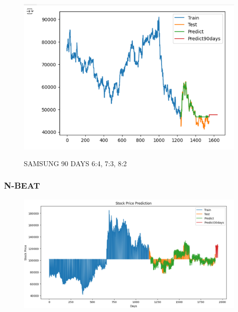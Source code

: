 \documentclass{article}
\begin{document}
\begin{multicols}{2}
\begin{figure}[H]
\begin{minipage}{0.15\textwidth}
    \label{fig:2}
    \end{minipage}%
    \begin{minipage}{0.15\textwidth}
    \centering
    \includegraphics[width=1\textwidth]{Image/GradientBoosting/SAMSUNG_90_8_2_GradientBoostingRegressor.png}

    \label{fig:3}
    \end{minipage}
    \caption{SAMSUNG 90 DAYS  6:4, 7:3, 8:2 }
\end{figure} 

\subsubsection{N-BEAT}



\begin{figure}[H]
    \centering
    \begin{minipage}{0.15\textwidth}
    \centering
    \includegraphics[width=1\textwidth]{Image/N_Beat/N_BEAT_6_4_LG_30DAYS.png}
   

\end{minipage}
\end{figure}
\end{multicols}
\end{document}
